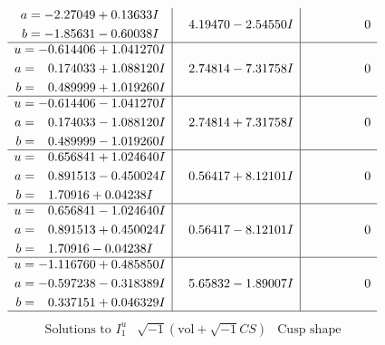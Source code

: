 \documentclass[1p]{elsarticle_modified}
\theoremstyle{definition}
\newcommand{\I}{\sqrt{-1}}
\begin{document}
$$\begin{array}{c|c|c}
\begin{aligned}
a &= -2.27049 + 0.13633 I \\
b &= -1.85631 - 0.60038 I\end{aligned}
 & \phantom{-}4.19470 - 2.54550 I & \phantom{-0.000000 } 0 \\ \hline\begin{aligned}
u &= -0.614406 + 1.041270 I \\
a &= \phantom{-}0.174033 + 1.088120 I \\
b &= \phantom{-}0.489999 + 1.019260 I\end{aligned}
 & \phantom{-}2.74814 - 7.31758 I & \phantom{-0.000000 } 0 \\ \hline\begin{aligned}
u &= -0.614406 - 1.041270 I \\
a &= \phantom{-}0.174033 - 1.088120 I \\
b &= \phantom{-}0.489999 - 1.019260 I\end{aligned}
 & \phantom{-}2.74814 + 7.31758 I & \phantom{-0.000000 } 0 \\ \hline\begin{aligned}
u &= \phantom{-}0.656841 + 1.024640 I \\
a &= \phantom{-}0.891513 - 0.450024 I \\
b &= \phantom{-}1.70916 + 0.04238 I\end{aligned}
 & \phantom{-}0.56417 + 8.12101 I & \phantom{-0.000000 } 0 \\ \hline\begin{aligned}
u &= \phantom{-}0.656841 - 1.024640 I \\
a &= \phantom{-}0.891513 + 0.450024 I \\
b &= \phantom{-}1.70916 - 0.04238 I\end{aligned}
 & \phantom{-}0.56417 - 8.12101 I & \phantom{-0.000000 } 0 \\ \hline\begin{aligned}
u &= -1.116760 + 0.485850 I \\
a &= -0.597238 - 0.318389 I \\
b &= \phantom{-}0.337151 + 0.046329 I\end{aligned}
 & \phantom{-}5.65832 - 1.89007 I & \phantom{-0.000000 } 0\\
 \hline 
 \end{array}$$\newpage$$\begin{array}{c|c|c}  
\text{Solutions to }I^u_{1}& \I (\text{vol} + \sqrt{-1}CS) & \text{Cusp shape}\\
 \hline 
\begin{aligned}

\end{aligned}
\end{array}$$
\end{document}
